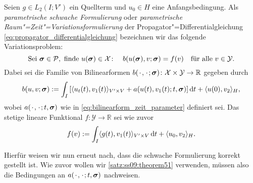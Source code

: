 \documentclass[../main.tex]{subfiles}
\begin{document}
\begin{Definition}%
\label{definition:parametrische_rz_variationsformulierung}
    Seien $g \in L_{2}(I; V')$ ein Quellterm und $u_{0} \in H$ eine Anfangsbedingung.
    Als \emph{parametrische schwache Formulierung} oder \emph{parametrische Raum"=Zeit"=Variationsformulierung} der Propagator"=Differentialgleichung \cref{eq:propagator_differentialgleichung} bezeichnen wir das folgende Variationsproblem:
    \begin{equation}
    \label{eq:parametrisches_rz_variationsproblem}
        \text{Sei}~\bm\sigma \in \mathcal P,~\text{finde}~u(\bm\sigma) \in \mathcal X \colon \quad b(u(\bm\sigma), v; \bm\sigma) = f(v) \quad \fa v \in \mathcal Y.
    \end{equation}
    Dabei sei die Familie von Bilinearformen $b({\mkern2mu\cdot\mkern2mu}, {\mkern2mu\cdot\mkern2mu}; \bm\sigma) \colon \mathcal X \times \mathcal Y \to \mathbb{R}$ gegeben durch
     \begin{equation}
     \label{eq:parametrisches_rz_variationsproblem:lhs}
         b(u, v; \bm\sigma)
             := \int_{I} \left[ \skp{u_{t}(t)}{v_{1}(t)}{V' \times V} + a(u(t), v_{1}(t); t, \bm\sigma) \right] \diff t + \skp{u(0)}{v_{2}}{H},
     \end{equation}
     wobei $a({\mkern2mu\cdot\mkern2mu}, {\mkern2mu\cdot\mkern2mu}; t, \bm\sigma)$ wie in \cref{eq:bilinearform_zeit_parameter} definiert sei.
     Das stetige lineare Funktional $f \colon \mathcal Y \to \mathbb{R}$ sei wie zuvor
     \begin{equation}
     \label{eq:parametrisches_rz_variationsproblem:rhs}
         f(v) := \int_{I} \skp{g(t)}{v_{1}(t)}{V' \times V} \diff t + \skp{u_{0}}{v_{2}}{H}.
     \end{equation}
\end{Definition}

Hierfür weisen wir nun erneut nach, dass die schwache Formulierung korrekt gestellt ist.
Wie zuvor wollen wir \cref{satz:ss09:theorem51} verwenden, müssen also die Bedingungen an $a({\mkern2mu\cdot\mkern2mu}, {\mkern2mu\cdot\mkern2mu};t, \bm\sigma)$ nachweisen.
\end{document}
